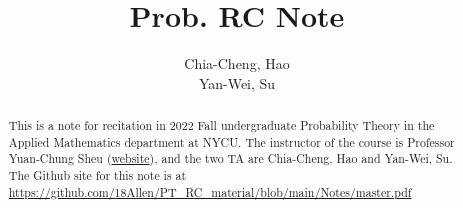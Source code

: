 \documentclass[a4paper]{report}
\author{Chia-Cheng, Hao \\ Yan-Wei, Su}
\title{Prob. RC Note}
\begin{document}
\maketitle

\begin{abstract}

This is a note for recitation in 2022 Fall undergraduate Probability Theory in the Applied Mathematics department at NYCU.
The instructor of the course is Professor Yuan-Chung Sheu (\href{https://jupiter.math.nycu.edu.tw/~sheu/}{website}), and the two TA are Chia-Cheng, Hao and Yan-Wei, Su.
The Github site for this note is at 
\\ \href{https://github.com/18Allen/PT_RC_material/blob/main/Notes/master.pdf}{https://github.com/18Allen/PT\_RC\_material/blob/main/Notes/master.pdf}
\end{abstract}

\newpage

\tableofcontents

\setcounter{chapter}{-1}

\newpage

%

\printbibliography
\end{document}
